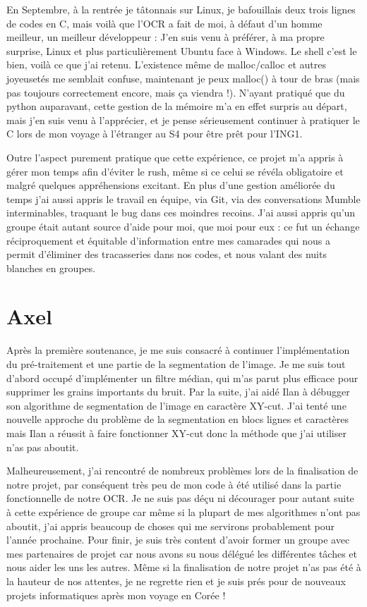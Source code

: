 \documentclass[11pt]{report}
\begin{document}
En Septembre, à la rentrée je tâtonnais sur Linux, je bafouillais deux trois lignes de codes en C, mais voilà que l’OCR a fait de moi, à défaut d’un homme meilleur, un meilleur développeur : J’en suis venu à préférer, à ma propre surprise, Linux et plus particulièrement Ubuntu face à Windows. Le shell c’est le bien, voilà ce que j’ai retenu. L’existence même de malloc/calloc et autres joyeusetés me semblait confuse, maintenant je peux malloc() à tour de bras (mais pas toujours correctement encore, mais ça viendra !). N’ayant pratiqué que du python auparavant, cette gestion de la mémoire m’a en effet surpris au départ, mais j’en suis venu à l’apprécier, et je pense sérieusement continuer à pratiquer le C lors de mon voyage à l’étranger au S4 pour être prêt pour l'ING1.

Outre l’aspect purement pratique que cette expérience, ce projet m’a appris à gérer mon temps afin d'éviter le rush, même si ce celui se révéla obligatoire et malgré quelques appréhensions excitant. En plus d’une gestion améliorée du temps j’ai aussi appris le travail en équipe, via Git, via des conversations Mumble interminables, traquant le bug dans ces moindres recoins. J’ai aussi appris qu’un groupe était autant source d’aide pour moi, que moi pour eux : ce fut un échange réciproquement et équitable d’information entre mes camarades qui nous a permit d’éliminer des tracasseries dans nos codes, et nous valant des nuits blanches en groupes.

\section{Axel}

Après la première soutenance, je me suis consacré à continuer l'implémentation du pré-traitement et une partie de la segmentation de l'image.
Je me suis tout d'abord occupé d’implémenter un filtre médian, qui m'as parut plus efficace pour supprimer les grains importants du bruit.
Par la suite, j'ai aidé Ilan à débugger son algorithme de segmentation de l'image en caractère XY-cut. 
J'ai tenté une nouvelle approche du problème de la segmentation en blocs lignes et caractères mais Ilan a réussit à faire fonctionner XY-cut donc la méthode que j'ai utiliser n'as pas aboutit.

Malheureusement, j'ai rencontré de nombreux problèmes lors de la finalisation de notre projet, par conséquent très peu de mon code à été utilisé dans la partie fonctionnelle de notre OCR.
Je ne suis pas déçu ni décourager pour autant suite à cette expérience de groupe car même si la plupart de mes algorithmes n'ont pas aboutit, j'ai appris beaucoup de choses qui me servirons probablement pour l'année prochaine.
Pour finir, je suis très content d'avoir former un groupe avec mes partenaires de projet car nous avons su nous délégué les différentes tâches et nous aider les uns les autres.
Même si la finalisation de notre projet n'as pas été à la hauteur de nos attentes, je ne regrette rien et je suis prés pour de nouveaux projets informatiques après mon voyage en Corée !
\end{document}
